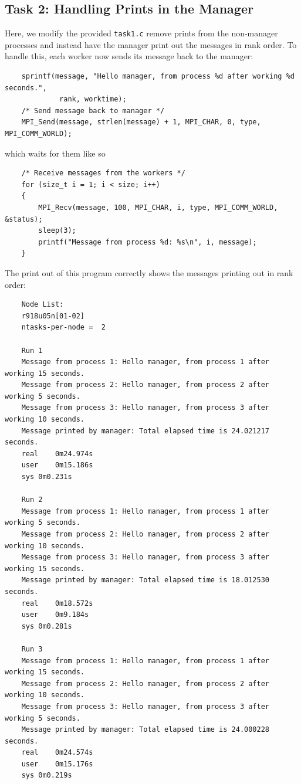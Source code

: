\documentclass{article}
\begin{document}
\subsection{Task 2: Handling Prints in the Manager}
Here, we modify the provided \texttt{task1.c} remove prints from the non-manager 
processes and instead have the manager print out the messages in rank order. To 
handle this, each worker now sends its message back to the manager:
\newpage
\begin{lstlisting}
    sprintf(message, "Hello manager, from process %d after working %d seconds.",
             rank, worktime);
    /* Send message back to manager */
    MPI_Send(message, strlen(message) + 1, MPI_CHAR, 0, type, MPI_COMM_WORLD);
\end{lstlisting}
which waits for them like so
\begin{lstlisting}
    /* Receive messages from the workers */
    for (size_t i = 1; i < size; i++)
    {
        MPI_Recv(message, 100, MPI_CHAR, i, type, MPI_COMM_WORLD, &status);
        sleep(3);
        printf("Message from process %d: %s\n", i, message);
    }
\end{lstlisting}
The print out of this program correctly shows the messages printing out in rank order:
\begin{verbatim}
    Node List:
    r918u05n[01-02]
    ntasks-per-node =  2

    Run 1
    Message from process 1: Hello manager, from process 1 after working 15 seconds.
    Message from process 2: Hello manager, from process 2 after working 5 seconds.
    Message from process 3: Hello manager, from process 3 after working 10 seconds.
    Message printed by manager: Total elapsed time is 24.021217 seconds.
    real	0m24.974s
    user	0m15.186s
    sys	0m0.231s
    
    Run 2
    Message from process 1: Hello manager, from process 1 after working 5 seconds.
    Message from process 2: Hello manager, from process 2 after working 10 seconds.
    Message from process 3: Hello manager, from process 3 after working 15 seconds.
    Message printed by manager: Total elapsed time is 18.012530 seconds.
    real	0m18.572s
    user	0m9.184s
    sys	0m0.281s
    
    Run 3
    Message from process 1: Hello manager, from process 1 after working 15 seconds.
    Message from process 2: Hello manager, from process 2 after working 10 seconds.
    Message from process 3: Hello manager, from process 3 after working 5 seconds.
    Message printed by manager: Total elapsed time is 24.000228 seconds.
    real	0m24.574s
    user	0m15.176s
    sys	0m0.219s
\end{verbatim}
\end{document}
